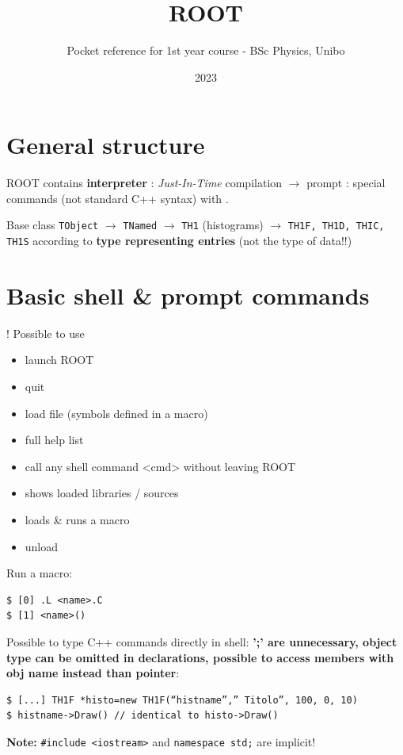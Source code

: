 \documentclass[10pt, oneside]{article}
\title{ROOT}
\author{Pocket reference for 1st year course - BSc Physics, Unibo}
\date{2023}
\begin{document}
\maketitle

\tableofcontents

\section{General structure}

ROOT contains \textbf{interpreter} : \textit{Just-In-Time} compilation $\rightarrow$ prompt : special commands (not standard C++ syntax) with .

Base class \texttt{TObject} $\rightarrow$ \texttt{TNamed} $\rightarrow$ \texttt{TH1} (histograms) $\rightarrow$ \texttt{TH1F, TH1D, THIC, TH1S} according to \textbf{type representing entries} (not the type of data!!)

\section{Basic shell \& prompt commands}
! Possible to use 
\begin{itemize}
\item {} launch ROOT
\item {} quit
\item {} load file (symbols defined in a macro)
\item {}  full help list
\item {} call any shell command <cmd> without leaving ROOT
\item {} shows loaded libraries / sources
\item {} loads \& runs a macro
\item {} unload
\end{itemize}
Run a macro:
\begin{verbatim}
$ [0] .L <name>.C
$ [1] <name>()
\end{verbatim}
Possible to type C++ commands directly in shell: \textbf{';' are unnecessary, object type can be omitted in declarations, possible to access members with obj name instead than pointer}:
\begin{verbatim}
$ [...] TH1F *histo=new TH1F(“histname”,” Titolo”, 100, 0, 10)
$ histname->Draw() // identical to histo->Draw()
\end{verbatim}
\textbf{Note:} \texttt{\#include <iostream>} and \texttt{namespace std;} are implicit!
\end{document}
